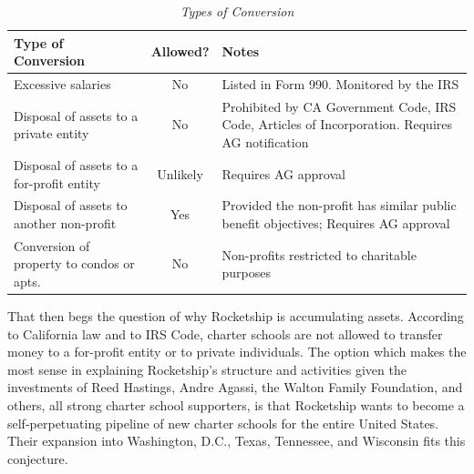 \noindent%
\begin{table}[ht]
  \caption[Types of Conversion]{\textit{Types of Conversion}}%
  \label{tab:types_conversion}
  \begin{tabulary}{0.9\textwidth}{LCL}
    \toprule
    \textbf{Type of Conversion}               & \mbox{\textbf{Allowed?}} & \textbf{Notes}                                                                                                          \\
    \midrule
    Excessive salaries                        & No                       & Listed in Form 990. Monitored by the IRS \vspace{\baselineskip}                                                         \\
    Disposal of assets to a private entity    & No                       & Prohibited by CA Government Code, IRS Code, Articles of Incorporation. Requires AG notification \vspace{\baselineskip} \\
    Disposal of assets to a for-profit entity & Unlikely                 & Requires AG approval \vspace{3\baselineskip}                                                                            \\
    Disposal of assets to another non-profit  & Yes                      & Provided the non-profit has similar public benefit objectives; Requires AG approval \vspace{2\baselineskip}             \\
    Conversion of property to condos or apts. & No                       & Non-profits restricted to charitable purposes                                                                           \\
    \bottomrule
  \end{tabulary}
\end{table}

That then begs the question of why Rocketship is accumulating assets. According to California law and to IRS Code, charter schools are not allowed to transfer money to a for-profit entity or to private individuals. The option which makes the most sense in explaining Rocketship's structure and activities given the investments of Reed Hastings, Andre Agassi, the Walton Family Foundation, and others, all strong charter school supporters, is that Rocketship wants to become a self-perpetuating pipeline of new charter schools for the entire United States. Their expansion into Washington, D.C., Texas, Tennessee, and Wisconsin fits this conjecture.

